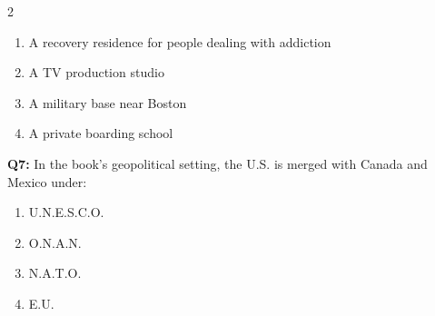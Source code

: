 \documentclass[10pt]{article}
\begin{document}
\begin{multicols}{2}
\begin{enumerate}[label=\arabic*.]
\item A recovery residence for people dealing with addiction
\item A TV production studio
\item A military base near Boston
\item A private boarding school
\end{enumerate}
\textbf{Q7:} In the book's geopolitical setting, the U.S. is merged with Canada and Mexico under:

\begin{enumerate}[label=\arabic*.]
\item U.N.E.S.C.O.
\item O.N.A.N.
\item N.A.T.O.
\item E.U.
\end{enumerate}
\end{multicols}

\newpage
\end{document}
